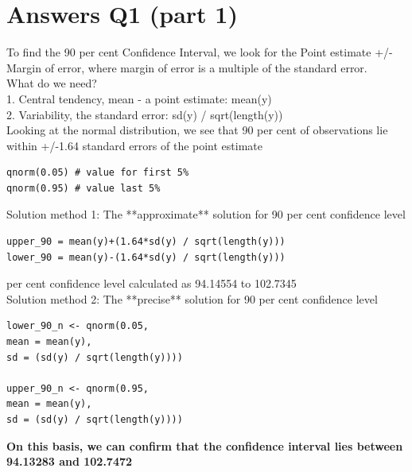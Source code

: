\documentclass[12pt,letterpaper]{article}
\begin{document}
\newpage

	\vspace{1cm}
\section*{Answers Q1 (part 1)}


\noindent To find the 90 per cent Confidence Interval, we look for the Point estimate +/- Margin of error, where margin of error is a multiple of the standard error.\\

\noindent What do we need? \\

1. Central tendency, mean - a point estimate: mean(y)  \\ 

2. Variability, the standard error:  sd(y) / sqrt(length(y)) \\

\noindent Looking at the normal distribution, we see that 90 per cent of observations lie within +/-1.64 standard errors of the point estimate \\

\begin{verbatim}
qnorm(0.05) # value for first 5% 
qnorm(0.95) # value last 5% 
\end{verbatim}

\noindent Solution method 1: The **approximate** solution for 90 per cent confidence level \\

\begin{verbatim}
upper_90 = mean(y)+(1.64*sd(y) / sqrt(length(y)))
lower_90 = mean(y)-(1.64*sd(y) / sqrt(length(y)))
\end{verbatim}

 per cent confidence level calculated as 94.14554 to 102.7345 \\

\noindent Solution method 2: The **precise** solution for 90 per cent confidence level \\

\begin{verbatim}
lower_90_n <- qnorm(0.05, 
mean = mean(y), 
sd = (sd(y) / sqrt(length(y))))

upper_90_n <- qnorm(0.95,
mean = mean(y),
sd = (sd(y) / sqrt(length(y))))
\end{verbatim}

\noindent  \textbf {On this basis, we can confirm that the confidence interval lies between 94.13283 and 102.7472}
 
\end{document}
